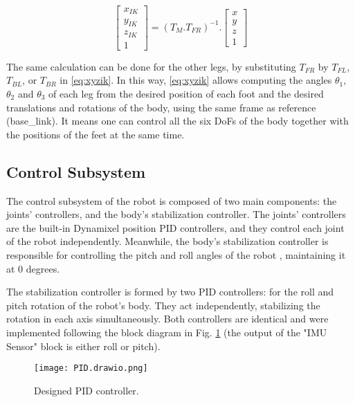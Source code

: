 \documentclass[conference]{IEEEtran}
\begin{document}
\begin{equation}
  \label{eq:xyzik}
  \begin{bmatrix}
    x_{IK} \\
    y_{IK} \\
    z_{IK} \\
    1
  \end{bmatrix}= (T_M.T_{FR})^{-1}.
  \begin{bmatrix}
    x \\
    y \\
    z \\
    1
  \end{bmatrix}
\end{equation}

The same calculation can be done for the other legs, by substituting $T_{FR}$ by $T_{FL}$, $T_{BL}$, or $T_{BR}$ in \eqref{eq:xyzik}. In this way, \eqref{eq:xyzik} allows computing the angles $\theta_1$, $\theta_2$ and $\theta_3$ of each leg from the desired position of each foot and the desired translations and rotations of the body, using the same frame as reference (base\_link). It means one can control all the six DoFs of the body together with the positions of the feet at the same time.

\subsection{Control Subsystem}

The control subsystem of the robot is composed of two main components: the joints' controllers, and the body's stabilization controller. The joints' controllers are the built-in Dynamixel position PID controllers, and they control each joint of the robot independently. Meanwhile, the body's stabilization controller is responsible for controlling the pitch and roll angles of the robot \cite{Shi2021, StanfordPupper}, maintaining it at 0 degrees.  

The stabilization controller is formed by two PID controllers: for the roll and pitch rotation of the robot's body. They act independently, stabilizing the rotation in each axis simultaneously. Both controllers are identical and were implemented following the block diagram in Fig. \ref{fig:pid} (the output of the "IMU Sensor" block is either roll or pitch).

\begin{figure}[b]
  \vspace{-\baselineskip}
  \centering
  \texttt{[image: PID.drawio.png]}
  \caption{Designed PID controller.}
  \label{fig:pid}
\end{figure}
\end{document}
